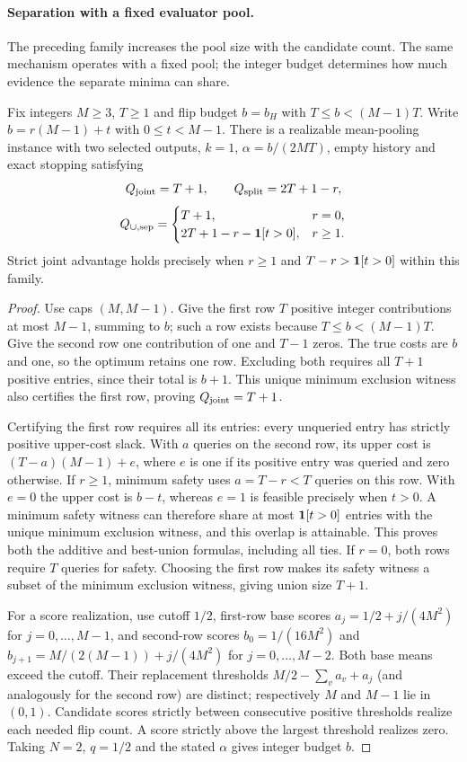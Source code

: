 \paragraph{Separation with a fixed evaluator pool.}
The preceding family increases the pool size with the candidate count. The same mechanism operates with a fixed pool; the integer budget determines how much evidence the separate minima can share.
\begin{proposition}
\label{prop:fixed-pool-separation}
Fix integers $M\ge3$, $T\ge1$ and flip budget $b=b_H$ with $T\le b<(M-1)T$. Write $b=r(M-1)+t$ with $0\le t<M-1$. There is a realizable mean-pooling instance with two selected outputs, $k=1$, $\alpha=b/(2MT)$, empty history and exact stopping satisfying
\[
 Q_{\rm joint}=T+1,\qquad Q_{\rm split}=2T+1-r,
\]
\[
 Q_{\cup,\rm sep}=\begin{cases}
 T+1,&r=0,\\
 2T+1-r-\mathbf{1}[t>0],&r\ge1.
 \end{cases}
\]
Strict joint advantage holds precisely when $r\ge1$ and $T-r>\mathbf{1}[t>0]$ within this family.
\end{proposition}
\begin{proof}
Use caps $(M,M-1)$. Give the first row $T$ positive integer contributions at most $M-1$, summing to $b$; such a row exists because $T\le b<(M-1)T$. Give the second row one contribution of one and $T-1$ zeros. The true costs are $b$ and one, so the optimum retains one row. Excluding both requires all $T+1$ positive entries, since their total is $b+1$. This unique minimum exclusion witness also certifies the first row, proving $Q_{\rm joint}=T+1$.

Certifying the first row requires all its entries: every unqueried entry has strictly positive upper-cost slack. With $a$ queries on the second row, its upper cost is $(T-a)(M-1)+e$, where $e$ is one if its positive entry was queried and zero otherwise. If $r\ge1$, minimum safety uses $a=T-r<T$ queries on this row. With $e=0$ the upper cost is $b-t$, whereas $e=1$ is feasible precisely when $t>0$. A minimum safety witness can therefore share at most $\mathbf{1}[t>0]$ entries with the unique minimum exclusion witness, and this overlap is attainable. This proves both the additive and best-union formulas, including all ties. If $r=0$, both rows require $T$ queries for safety. Choosing the first row makes its safety witness a subset of the minimum exclusion witness, giving union size $T+1$.

For a score realization, use cutoff $1/2$, first-row base scores $a_j=1/2+j/(4M^2)$ for $j=0,\ldots,M-1$, and second-row scores $b_0=1/(16M^2)$ and $b_{j+1}=M/(2(M-1))+j/(4M^2)$ for $j=0,\ldots,M-2$. Both base means exceed the cutoff. Their replacement thresholds $M/2-\sum_v a_v+a_j$ (and analogously for the second row) are distinct; respectively $M$ and $M-1$ lie in $(0,1)$. Candidate scores strictly between consecutive positive thresholds realize each needed flip count. A score strictly above the largest threshold realizes zero. Taking $N=2$, $q=1/2$ and the stated $\alpha$ gives integer budget $b$.
\end{proof}

